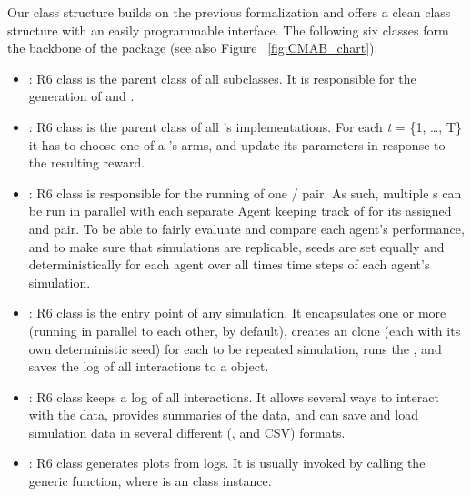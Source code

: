 \documentclass{jss}
\begin{document}
Our class structure builds on the previous formalization and offers a clean class structure with an easily programmable interface. The following six classes form the backbone of the package (see also Figure ~\ref{fig:CMAB_chart}):

\begin{itemize}
         \item {}: R6 class  is the parent class of all   subclasses. It is responsible for the generation of  and .

         \item {}: R6 class  is the parent class of all 's  implementations. For each \emph{t} = \{1, \ldots, T\} it has to choose one of a 's  arms, and update its parameters  in response to the resulting reward.

         \item {}: R6 class  is responsible for the running of one / pair. As such, multiple s can be run in parallel with each separate Agent keeping track of  for its assigned  and  pair. To be able to fairly evaluate and compare each agent's performance, and to make sure that simulations are replicable, seeds are set equally and deterministically for each agent over all  times  time steps of each agent's simulation.

         \item {}: R6 class  is the entry point of any  simulation. It encapsulates one or more  (running in parallel to each other, by default), creates an  clone (each with its own deterministic seed) for each to be repeated simulation, runs the , and saves the log of all  interactions to a  object.

         \item {}: R6 class  keeps a log of all  interactions. It allows several ways to interact with the data, provides summaries of the data, and can save and load simulation data in several different (,  and CSV) formats.

         \item {}: R6 class  generates plots from  logs. It is usually invoked by calling the generic  function, where  is an  class instance.
\end{itemize}
\end{document}
